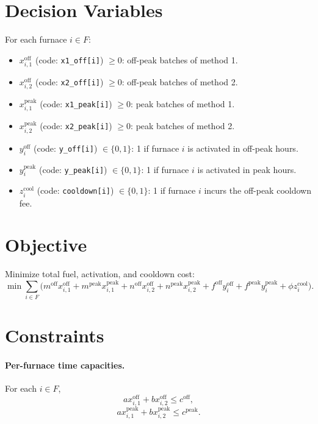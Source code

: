 \section*{Decision Variables}

For each furnace $i\in F$:

\begin{itemize}
    \item $x_{i,1}^{\text{off}}$ (code: \texttt{x1\_off[i]}) $\ge 0$: off-peak batches of method 1.
    \item $x_{i,2}^{\text{off}}$ (code: \texttt{x2\_off[i]}) $\ge 0$: off-peak batches of method 2.
    \item $x_{i,1}^{\text{peak}}$ (code: \texttt{x1\_peak[i]}) $\ge 0$: peak batches of method 1.
    \item $x_{i,2}^{\text{peak}}$ (code: \texttt{x2\_peak[i]}) $\ge 0$: peak batches of method 2.
    \item $y_i^{\text{off}}$ (code: \texttt{y\_off[i]}) $\in \{0,1\}$: 1 if furnace $i$ is activated in off-peak hours.
    \item $y_i^{\text{peak}}$ (code: \texttt{y\_peak[i]}) $\in \{0,1\}$: 1 if furnace $i$ is activated in peak hours.
    \item $z_i^{\text{cool}}$ (code: \texttt{cooldown[i]}) $\in \{0,1\}$: 1 if furnace $i$ incurs the off-peak cooldown fee.
\end{itemize}

\section*{Objective}

Minimize total fuel, activation, and cooldown cost:
\[
\min \sum_{i\in F}\Big(
m^{\text{off}}x_{i,1}^{\text{off}}
+m^{\text{peak}}x_{i,1}^{\text{peak}}
+n^{\text{off}}x_{i,2}^{\text{off}}
+n^{\text{peak}}x_{i,2}^{\text{peak}}
+f^{\text{off}}y_i^{\text{off}}
+f^{\text{peak}}y_i^{\text{peak}}
+\phi z_i^{\text{cool}}
\Big).
\]

\section*{Constraints}

\paragraph{Per-furnace time capacities.}
For each $i\in F$,
\[
a x_{i,1}^{\text{off}} + b x_{i,2}^{\text{off}} \le c^{\text{off}},
\]
\[
a x_{i,1}^{\text{peak}} + b x_{i,2}^{\text{peak}} \le c^{\text{peak}}.
\]

